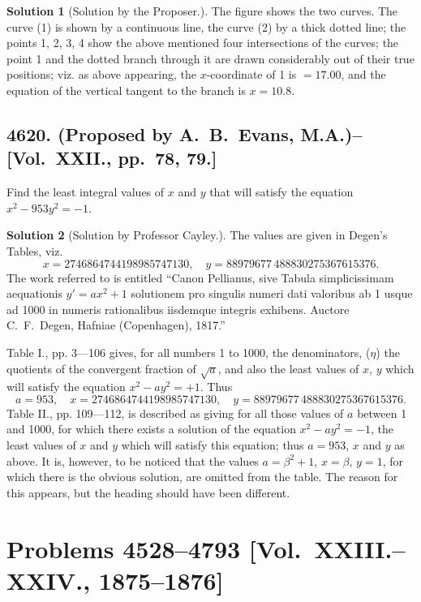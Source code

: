 \documentclass[11pt,a4paper]{article}
\theoremstyle{definition}
\newtheorem*{solution}{Solution}
\begin{document}
\begin{solution}[Solution by the Proposer.]
The figure shows the two curves. The curve (1) is shown by a continuous line, the curve (2) by a thick dotted line; the points 1, 2, 3, 4 show the above mentioned four intersections of the curves; the point 1 and the dotted branch through it are drawn considerably out of their true positions; viz. as above appearing, the $x$-coordinate of 1 is $=17.00$, and the equation of the vertical tangent to the branch is $x=10.8$.
\end{solution}

\newpage

\subsection*{4620. (Proposed by A.~B.~Evans, M.A.)\---[Vol.~XXII., pp.~78, 79.]}

Find the least integral values of $x$ and $y$ that will satisfy the equation $x^2 - 953y^2 = -1$.

\begin{solution}[Solution by Professor Cayley.]
The values are given in Degen's Tables, viz.
\[
x = 2746864744198985747130, \quad y = 88979677\,488830275367615376.
\]
The work referred to is entitled ``Canon Pellianus, sive Tabula simplicissimam aequationis $y' = ax^2+1$ solutionem pro singulis numeri dati valoribus ab 1 usque ad 1000 in numeris rationalibus iisdemque integris exhibens. Auctore C.~F.~Degen, Hafniae (Copenhagen), 1817.''

Table I., pp. 3---106 gives, for all numbers 1 to 1000, the denominators, ($\eta$) the quotients of the convergent fraction of $\sqrt{a}$, and also the least values of $x$, $y$ which will satisfy the equation $x^2 - ay^2 = +1$. Thus
\[
a=953, \quad x = 2746864744198985747130, \quad y = 88979677\,488830275367615376.
\]
Table II., pp. 109---112, is described as giving for all those values of $a$ between 1 and 1000, for which there exists a solution of the equation $x^2 - ay^2 = -1$, the least values of $x$ and $y$ which will satisfy this equation; thus $a=953$, $x$ and $y$ as above. It is, however, to be noticed that the values $a = \beta^2+1$, $x=\beta$, $y=1$, for which there is the obvious solution, are omitted from the table. The reason for this appears, but the heading should have been different.
\end{solution}

\newpage

\section*{Problems 4528--4793 [Vol.~XXIII.--XXIV., 1875--1876]}
\end{document}
